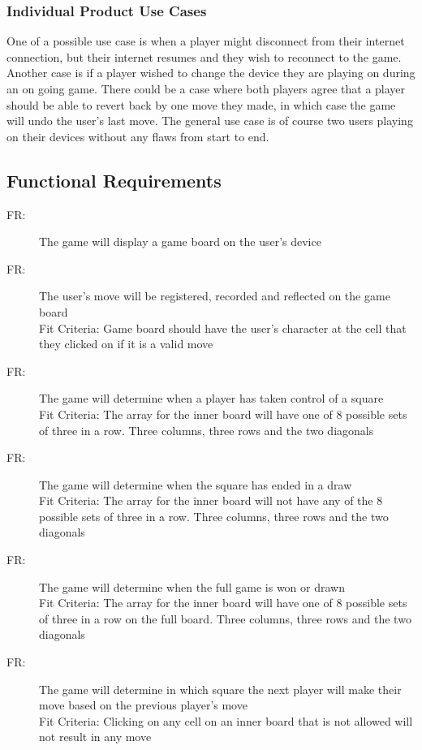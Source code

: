 \documentclass[12pt, titlepage]{article}
\newcounter{funreq}
\newcommand{\frthefunreq}{FR\thefunreq}
\begin{document}
\subsubsection{Individual Product Use Cases}
One of a possible use case is when a player might disconnect from their
internet connection, but their internet resumes and they wish to reconnect to
the game. Another case is if a player wished to change the device they are
playing on during an on going game. There could be a case where both players
agree that a player should be able to revert back by one move they made, in
which case the game will undo the user's last move. The general use case is of
course two users playing on their devices without any flaws from start to end.

\subsection{Functional Requirements}
\begin{description}
\item [ \frthefunreq:] The game will display a game board on the user's device
\item [ \frthefunreq:] The user's move will be registered, recorded and reflected on the game board\\
Fit Criteria: Game board should have the user's character at the cell that they clicked on if it is a valid move
\item [ \frthefunreq:] The game will determine when a player has taken control of a square\\
Fit Criteria: The array for the inner board will have one of 8 possible sets of three in a row. Three columns, three rows 
and the two diagonals
\item [ \frthefunreq:] The game will determine when the square has ended in a draw\\
Fit Criteria: The array for the inner board will not have any of the 8 possible sets of three in a row. Three columns, three rows
 and the two diagonals
\item [ \frthefunreq:] The game will determine when the full game is won or drawn\\
Fit Criteria: The array for the inner board will have one of 8 possible sets of three in a row on the full board. 
Three columns, three rows and the two diagonals
\item [ \frthefunreq:] The game will determine in which square the next player will make their move 
based on the previous player's move\\
Fit Criteria: Clicking on any cell on an inner board that is not allowed will not result in any move
\end{description}
\end{document}
